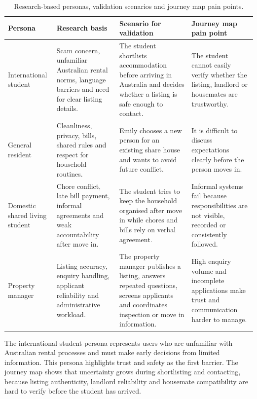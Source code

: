 \documentclass[11pt,a4paper]{article}
\begin{document}
\begin{table}[H]
    \centering
    \small
    \caption{Research-based personas, validation scenarios and journey map pain points.}
    \begin{tabularx}{\textwidth}{@{}L{3.0cm} Y Y Y@{}}
        \toprule
        Persona & Research basis & Scenario for validation & Journey map pain point\\
        \midrule
        International student & Scam concern, unfamiliar Australian rental norms, language barriers and need for clear listing details. & The student shortlists accommodation before arriving in Australia and decides whether a listing is safe enough to contact. & The student cannot easily verify whether the listing, landlord or housemates are trustworthy.\\
        General resident & Cleanliness, privacy, bills, shared rules and respect for household routines. & Emily chooses a new person for an existing share house and wants to avoid future conflict. & It is difficult to discuss expectations clearly before the person moves in.\\
        Domestic shared living student & Chore conflict, late bill payment, informal agreements and weak accountability after move in. & The student tries to keep the household organised after move in while chores and bills rely on verbal agreement. & Informal systems fail because responsibilities are not visible, recorded or consistently followed.\\
        Property manager & Listing accuracy, enquiry handling, applicant reliability and administrative workload. & The property manager publishes a listing, answers repeated questions, screens applicants and coordinates inspection or move in information. & High enquiry volume and incomplete applications make trust and communication harder to manage.\\
        \bottomrule
    \end{tabularx}
    \label{tabpersonas}
\end{table}

The international student persona represents users who are unfamiliar with Australian rental processes and must make early decisions from limited information. This persona highlights trust and safety as the first barrier. The journey map shows that uncertainty grows during shortlisting and contacting, because listing authenticity, landlord reliability and housemate compatibility are hard to verify before the student has arrived.
\end{document}
